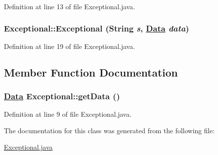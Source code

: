Definition at line 13 of file Exceptional.java.\hypertarget{classExceptional_a2}{
\subsubsection[Exceptional]{\setlength{\rightskip}{0pt plus 5cm}Exceptional::Exceptional (String {\em s}, \hyperlink{interfaceData}{Data} {\em data})}}
\label{classExceptional_a2}




Definition at line 19 of file Exceptional.java.

\subsection{Member Function Documentation}
\hypertarget{classExceptional_a0}{
\subsubsection[getData]{\setlength{\rightskip}{0pt plus 5cm}\hyperlink{interfaceData}{Data} Exceptional::get\-Data ()}}
\label{classExceptional_a0}




Definition at line 9 of file Exceptional.java.

The documentation for this class was generated from the following file:\begin{CompactItemize}
\item 
\hyperlink{Exceptional_8java-source}{Exceptional.java}\end{CompactItemize}
